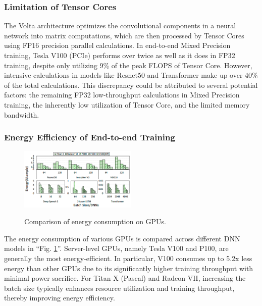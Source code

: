 \subsubsection{Limitation of Tensor Cores}
The Volta architecture optimizes the convolutional components in a neural network into matrix computations, which are then processed by Tensor Cores using FP16 precision parallel calculations.
In end-to-end Mixed Precision training, Tesla V100 (PCIe) performs over twice as well as it does in FP32 training, despite only utilizing 9\% of the peak FLOPS of Tensor Core.
However, intensive calculations in models like Resnet50 and Transformer make up over 40\% of the total calculations.
This discrepancy could be attributed to several potential factors: the remaining FP32 low-throughput calculations in Mixed Precision training, the inherently low utilization of Tensor Core, and the limited memory bandwidth.

\subsubsection{Energy Efficiency of End-to-end Training}
\begin{figure}[htbp!]
    \centering
    {    \includegraphics[width=0.5\textwidth]{images/energycomp}}
    \caption{Comparison of energy consumption on GPUs.}
    \label{fig:energycomp}
\end{figure}

The energy consumption of various GPUs is compared across different DNN models in ``Fig. \ref{fig:energycomp}''.
Server-level GPUs, namely Tesla V100 and P100, are generally the most energy-efficient.
In particular, V100 consumes up to 5.2x less energy than other GPUs due to its significantly higher training throughput with minimal power sacrifice.
For Titan X (Pascal) and Radeon VII, increasing the batch size typically enhances resource utilization and training throughput, thereby improving energy efficiency.
